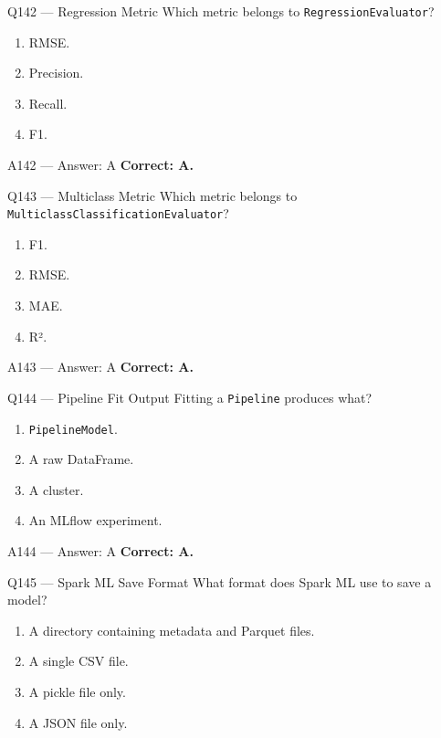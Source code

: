 \documentclass[aspectratio=169,9pt]{beamer}
\begin{document}
	\begin{frame}{Q142 --- Regression Metric}
		Which metric belongs to \texttt{RegressionEvaluator}?
		\begin{enumerate}[label=\Alph*.]
			\item RMSE.
			\item Precision.
			\item Recall.
			\item F1.
		\end{enumerate}
	\end{frame}
	
	\begin{frame}{A142 --- Answer: A}
		\textbf{Correct: A.}
	\end{frame}
	
	\begin{frame}{Q143 --- Multiclass Metric}
		Which metric belongs to \texttt{MulticlassClassificationEvaluator}?
		\begin{enumerate}[label=\Alph*.]
			\item F1.
			\item RMSE.
			\item MAE.
			\item R².
		\end{enumerate}
	\end{frame}
	
	\begin{frame}{A143 --- Answer: A}
		\textbf{Correct: A.}
	\end{frame}
	
	\begin{frame}{Q144 --- Pipeline Fit Output}
		Fitting a \texttt{Pipeline} produces what?
		\begin{enumerate}[label=\Alph*.]
			\item \texttt{PipelineModel}.
			\item A raw DataFrame.
			\item A cluster.
			\item An MLflow experiment.
		\end{enumerate}
	\end{frame}
	
	\begin{frame}{A144 --- Answer: A}
		\textbf{Correct: A.}
	\end{frame}
	
	\begin{frame}{Q145 --- Spark ML Save Format}
		What format does Spark ML use to save a model?
		\begin{enumerate}[label=\Alph*.]
			\item A directory containing metadata and Parquet files.
			\item A single CSV file.
			\item A pickle file only.
			\item A JSON file only.
		\end{enumerate}
	\end{frame}
	
\end{document}
